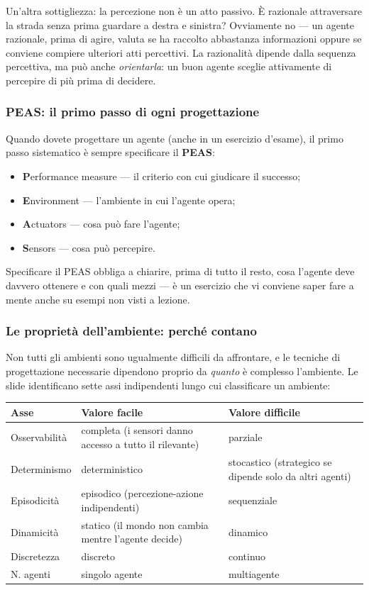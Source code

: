 \documentclass[11pt,a4paper]{article}
\begin{document}
Un'altra sottigliezza: la percezione non è un atto passivo. È razionale attraversare la strada senza prima guardare a destra e sinistra? Ovviamente no --- un agente razionale, prima di agire, valuta se ha raccolto abbastanza informazioni oppure se conviene compiere ulteriori atti percettivi. La razionalità dipende dalla sequenza percettiva, ma può anche \emph{orientarla}: un buon agente sceglie attivamente di percepire di più prima di decidere.

\subsubsection{PEAS: il primo passo di ogni progettazione}

Quando dovete progettare un agente (anche in un esercizio d'esame), il primo passo sistematico è sempre specificare il \textbf{PEAS}:

\begin{itemize}
  \item \textbf{P}erformance measure --- il criterio con cui giudicare il successo;
  \item \textbf{E}nvironment --- l'ambiente in cui l'agente opera;
  \item \textbf{A}ctuators --- cosa può fare l'agente;
  \item \textbf{S}ensors --- cosa può percepire.
\end{itemize}

Specificare il PEAS obbliga a chiarire, prima di tutto il resto, cosa l'agente deve davvero ottenere e con quali mezzi --- è un esercizio che vi conviene saper fare a mente anche su esempi non visti a lezione.

\subsubsection{Le proprietà dell'ambiente: perché contano}

Non tutti gli ambienti sono ugualmente difficili da affrontare, e le tecniche di progettazione necessarie dipendono proprio da \emph{quanto} è complesso l'ambiente. Le slide identificano sette assi indipendenti lungo cui classificare un ambiente:

\begin{center}
\begin{tabular}{@{}p{3.3cm}p{4.6cm}p{4.6cm}@{}}
\toprule
\textbf{Asse} & \textbf{Valore facile} & \textbf{Valore difficile} \\
\midrule
Osservabilità & completa (i sensori danno accesso a tutto il rilevante) & parziale \\
Determinismo & deterministico & stocastico (strategico se dipende solo da altri agenti) \\
Episodicità & episodico (percezione-azione indipendenti) & sequenziale \\
Dinamicità & statico (il mondo non cambia mentre l'agente decide) & dinamico \\
Discretezza & discreto & continuo \\
N. agenti & singolo agente & multiagente \\
\bottomrule
\end{tabular}
\end{center}
\end{document}
